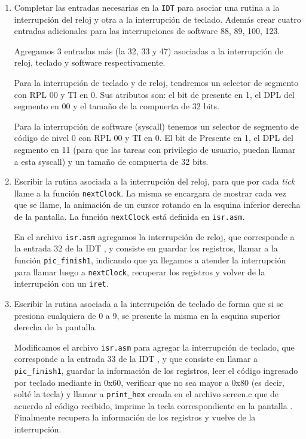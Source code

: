 \documentclass[a4paper]{article}
\begin{document}
 \begin{enumerate}[label=\alph*)]
 	\item Completar las entradas necesarias en la \texttt{IDT} para asociar una rutina a la interrupción del reloj y otra a la interrupción de teclado. Además crear cuatro entradas adicionales para las interrupciones de software 88, 89, 100, 123.
 	
 	Agregamos 3 entradas m\'as (la 32, 33 y 47) asociadas a la interrupci\'on de reloj, teclado y software respectivamente.
 	
 	Para la interrupci\'on de teclado y de reloj, tendremos un selector de segmento con RPL 00 y TI en 0. Sus atributos son: el bit de presente en 1, el DPL del segmento en 00 y el tama\~no de la compuerta de 32 bits.
 	
 	Para la interrupci\'on de software (syscall) tenemos un selector de segmento de c\'odigo de nivel 0 con RPL 00 y TI en 0. El bit de Presente en 1, el DPL del segmento en 11 (para que las tareas con privilegio de usuario, puedan llamar a esta syscall) y un tama\~no de compuerta de 32 bits.
 	
 	\item Escribir la rutina asociada a la interrupción del reloj, para que por cada \textit{tick} llame a la función \texttt{nextClock}. La misma se encargara de mostrar cada vez que se llame, la animación	de un cursor rotando en la esquina inferior derecha de la pantalla. La función \texttt{nextClock} está definida en \texttt{isr.asm}.
 	
 	En el archivo \texttt{isr.asm} agregamos la interrupción de reloj, que corresponde a la entrada 32 de la IDT , y consiste en guardar los registros, llamar a la función \texttt{pic\_finish1}, indicando que ya	llegamos a atender la interrupción para llamar luego a \texttt{nextClock}, recuperar los registros y volver de la interrupción con un \texttt{iret}.
 	
 	\item Escribir la rutina asociada a la interrupción de teclado de forma que si se presiona cualquiera de 0 a 9, se presente la misma en la esquina superior derecha de la pantalla.
 	
 	
 	Modificamos el archivo \texttt{isr.asm} para agregar la interrupci\'on de teclado, que corresponde a la entrada 33 de la IDT , y que consiste en llamar a \texttt{pic\_finish1}, guardar la información de los registros, leer el c\'odigo ingresado por teclado mediante in 0x60, verificar que no sea mayor a 0x80 (es decir, solt\'e la tecla) y llamar a \texttt{print\_hex} creada en el archivo screen.c que de acuerdo al código recibido, imprime la tecla correspondiente en la pantalla . Finalmente recupera la información de los registros y vuelve de la interrupción.
 	

\end{enumerate}
\end{document}
